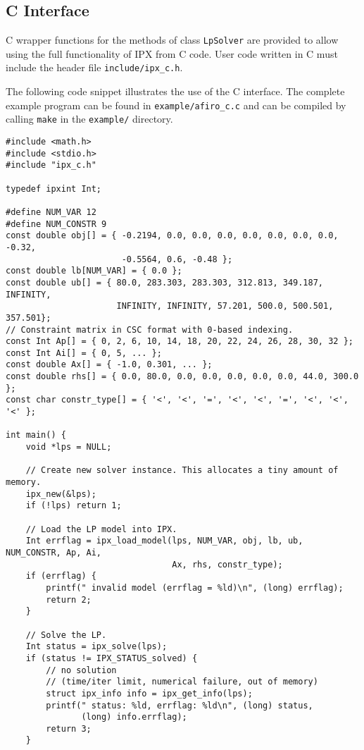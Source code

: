 \documentclass{article}
\newcommand{\ct}{\texttt}
\begin{document}
\subsection{C Interface}
C wrapper functions for the methods of class \ct{LpSolver} are provided to allow
using the full functionality of IPX from C code. User code written in C must
include the header file \ct{include/ipx\_c.h}.

The following code snippet illustrates the use of the C interface. The
complete example program can be found in \ct{example/afiro\_c.c} and can be
compiled by calling \ct{make} in the \ct{example/} directory.

\begin{footnotesize}
\begin{verbatim}
#include <math.h>
#include <stdio.h>
#include "ipx_c.h"

typedef ipxint Int;

#define NUM_VAR 12
#define NUM_CONSTR 9
const double obj[] = { -0.2194, 0.0, 0.0, 0.0, 0.0, 0.0, 0.0, 0.0, -0.32,
                       -0.5564, 0.6, -0.48 };
const double lb[NUM_VAR] = { 0.0 };
const double ub[] = { 80.0, 283.303, 283.303, 312.813, 349.187, INFINITY,
                      INFINITY, INFINITY, 57.201, 500.0, 500.501, 357.501};
// Constraint matrix in CSC format with 0-based indexing.
const Int Ap[] = { 0, 2, 6, 10, 14, 18, 20, 22, 24, 26, 28, 30, 32 };
const Int Ai[] = { 0, 5, ... };
const double Ax[] = { -1.0, 0.301, ... };
const double rhs[] = { 0.0, 80.0, 0.0, 0.0, 0.0, 0.0, 0.0, 44.0, 300.0 };
const char constr_type[] = { '<', '<', '=', '<', '<', '=', '<', '<', '<' };

int main() {
    void *lps = NULL;

    // Create new solver instance. This allocates a tiny amount of memory.
    ipx_new(&lps);
    if (!lps) return 1;

    // Load the LP model into IPX.
    Int errflag = ipx_load_model(lps, NUM_VAR, obj, lb, ub, NUM_CONSTR, Ap, Ai,
                                 Ax, rhs, constr_type);
    if (errflag) {
        printf(" invalid model (errflag = %ld)\n", (long) errflag);
        return 2;
    }

    // Solve the LP.
    Int status = ipx_solve(lps);
    if (status != IPX_STATUS_solved) {
        // no solution
        // (time/iter limit, numerical failure, out of memory)
        struct ipx_info info = ipx_get_info(lps);
        printf(" status: %ld, errflag: %ld\n", (long) status,
               (long) info.errflag);
        return 3;
    }


\end{verbatim}
\end{footnotesize}
\end{document}

